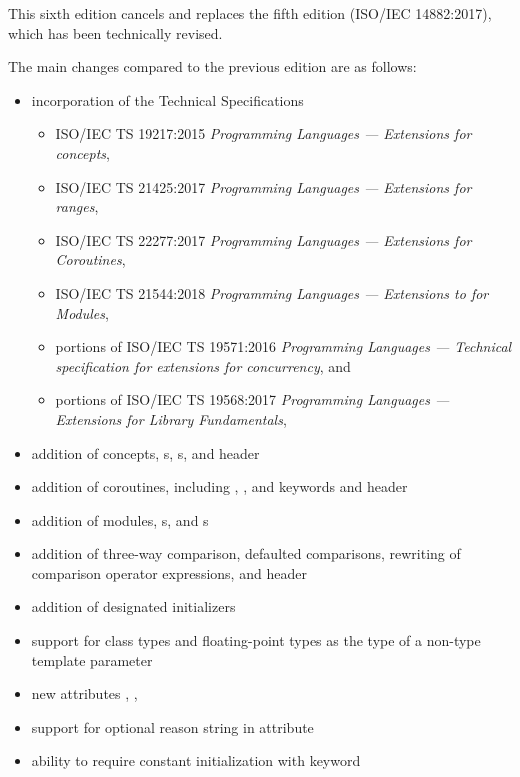 This sixth edition cancels and replaces the fifth edition
(ISO/IEC 14882:2017), which has been technically revised.

The main changes compared to the previous edition are as follows:

\begin{itemize}
\item incorporation of the Technical Specifications
\begin{itemize}
\item ISO/IEC TS 19217:2015 \textit{Programming Languages --- \Cpp{} Extensions for concepts},
\item ISO/IEC TS 21425:2017 \textit{Programming Languages --- \Cpp{} Extensions for ranges},
\item ISO/IEC TS 22277:2017 \textit{Programming Languages --- \Cpp{} Extensions for Coroutines},
\item ISO/IEC TS 21544:2018 \textit{Programming Languages --- Extensions to \Cpp{} for Modules},
\item portions of ISO/IEC TS 19571:2016 \textit{Programming Languages --- Technical specification for \Cpp{} extensions for concurrency}, and %
\item portions of ISO/IEC TS 19568:2017 \textit{Programming Languages --- \Cpp{} Extensions for Library Fundamentals},
\end{itemize}
\item addition of concepts, s, s, and
 header
\item addition of coroutines, including
, , and  keywords and
 header
\item addition of modules, s, and s
\item addition of three-way comparison, defaulted comparisons,
rewriting of comparison operator expressions, and  header
\item addition of designated initializers
\item support for class types and floating-point types as the type of a non-type template parameter
\item new attributes , \tcode{[[likely]]}, \tcode{[[unlikely]]}
\item support for optional reason string in \tcode{[[nodiscard]]} attribute
\item ability to require constant initialization with  keyword

\end{itemize}
